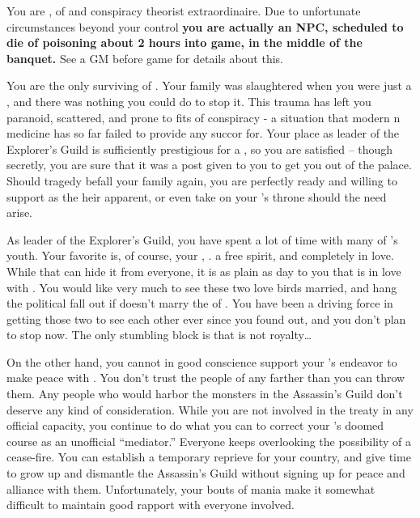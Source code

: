 \documentclass[char]{NeptuneBall}
\begin{document}
\name{\cPlant{}}

You are \cPlant{}, \cPlant{\prince} of \pAtlantis{} and conspiracy theorist extraordinaire. Due to unfortunate circumstances beyond your control {\bf you are actually an NPC, scheduled to die of poisoning about 2 hours into game, in the middle of the banquet. }  See a GM before game for details about this.

You are the only surviving \cPlant{\sibling} of \cKing{}. Your family was slaughtered when you were just a \cPlant{\kid}, and there was nothing you could do to stop it. This trauma has left you paranoid, scattered, and prone to fits of conspiracy - a situation that modern \pAtlantis{}n medicine has so far failed to provide any succor for. Your place as leader of the Explorer's Guild is sufficiently prestigious for a \cPlant{\prince}, so you are satisfied -- though secretly, you are sure that it was a post given to you to get you out of the palace. Should tragedy befall your family again, you are perfectly ready and willing to support \cPrincess{\prince} \cPrincess{} as the heir apparent, or even take on your \cKing{\sibling}'s throne should the need arise.

As leader of the Explorer's Guild, you have spent a lot of time with many of \pAtlantis{}'s youth. Your favorite is, of course, your \cPrincess{\nephew}, \cPrincess{\prince} \cPrincess{}. \cPrincess{\They} \cPrincess{\are} a free spirit, and completely in love. While \cPrincess{\they} \cPrincess{\think} that \cPrincess{\they} can hide it from everyone, it is as plain as day to you that \cPrincess{} is in love with \cDiplomat{}. You would like very much to see these two love birds married, and hang the political fall out if \cPrincess{} doesn't marry the \cPrince{\prince} of \pPacifica{}. You have been a driving force in getting those two to see each other ever since you found out, and you don't plan to stop now. The only stumbling block is that \cDiplomat{} is not royalty\ldots

On the other hand, you cannot in good conscience support your \cKing{\sibling}'s endeavor to make peace with \pPacifica{}. You don't trust the people of \pPacifica{} any farther than you can throw them. Any people who would harbor the monsters in the Assassin's Guild don't deserve any kind of consideration. While you are not involved in the treaty in any official capacity, you continue to do what you can to correct your \cKing{\sibling}'s doomed course as an unofficial ``mediator.'' Everyone keeps overlooking the possibility of a cease-fire. You can establish a temporary reprieve for your country, and give \pPacifica{} time to grow up and dismantle the Assassin's Guild without signing up for peace and alliance with them. Unfortunately, your bouts of mania make it somewhat difficult to maintain good rapport with everyone involved.
\end{document}
